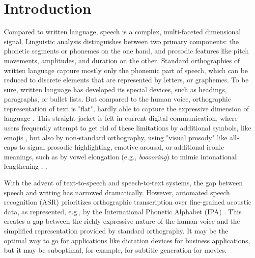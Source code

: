 \normallinespacing



\normallinespacing

\chapter{Introduction}

Compared to written language, speech is a complex, multi-faceted dimensional signal. Linguistic analysis distinguishes between two primary components: the phonetic segments or phonemes on the one hand, and prosodic features like pitch movements, amplitudes, and duration on the other. Standard orthographies of written language capture mostly only the phonemic part of speech, which can be reduced to discrete elements that are represented by letters, or graphemes. To be sure, written language has developed its special devices, such as headings, paragraphs, or bullet lists. But compared to the human voice, orthographic representation of text is "flat", hardly able to capture the expressive dimension of language \cite{pataca2021speech}. This straight-jacket is felt in current digital communication, where users frequently attempt to get rid of these limitations by additional symbols, like emojis \cite{zappavigna2024}, but also by non-standard orthography, using "visual prosody" like all-caps to signal prosodic highlighting, emotive arousal, or additional iconic meanings, such as by vowel elongation (e.g., \textit{booooring}) to mimic intonational lengthening \cite{fuchs2019}, \cite{heath2020no}. 

With the advent of text-to-speech and speech-to-text systems, the gap between speech and writing has narrowed dramatically. However, automated speech recognition (ASR) prioritizes orthographic transcription over fine-grained acoustic data, as represented, e.g., by the International Phonetic Alphabet (IPA) \cite{internationalphoneticassociation1999ipa}. This creates a gap between the richly expressive nature of the human voice and the simplified representation provided by standard orthography. It may be the optimal way to go for applications like dictation devices for business applications, but it may be suboptimal, for example, for subtitle generation for movies. 

